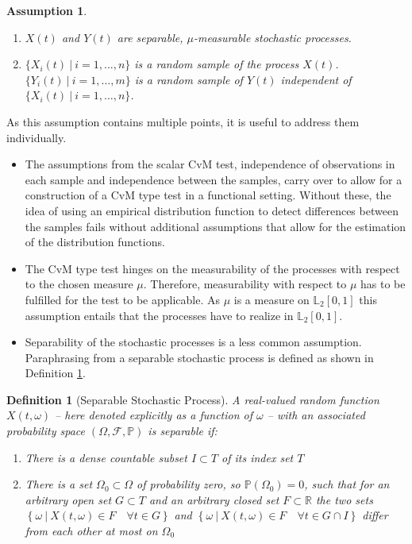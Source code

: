 \documentclass[12pt, a4paper]{article}
\theoremstyle{MAstyle} \newtheorem{assumption}{Assumption}[section]
\theoremstyle{MAstyle} \newtheorem{definition}{Definition}[section]
\theoremstyle{MAstyle} \newtheorem{theorem}{Theorem}[section]
\begin{document}
			\newpage
			\begin{assumption}\label{Ass1}\hfill\vspace{-0.8cm}
				\begin{enumerate}
					\item $X(t)$ and $Y(t)$ are separable, $\mu$-measurable stochastic processes.
					\item $\{X_i(t) \: \vert \: i = 1, \dots, n\}$ is a random sample of the process $X(t)$. \\
					$\{Y_i(t) \: \vert \: i = 1, \dots, m\}$ is a random sample of $Y(t)$ independent of $\{X_i(t) \: \vert \: i = 1, \dots, n\}$.
				\end{enumerate}
			\end{assumption}
		As this assumption contains multiple points, it is useful to address them individually.
			\begin{itemize}
				\item The assumptions from the scalar CvM test, independence of observations in each sample and independence between the samples, carry over to allow for a construction of a CvM type test in a functional setting. Without these, the idea of using an empirical distribution function to detect differences between the samples fails without additional assumptions that allow for the estimation of the distribution functions.
				\item The CvM type test hinges on the measurability of the processes with respect to the chosen measure $\mu$. Therefore, measurability with respect to $\mu$ has to be fulfilled for the test to be applicable. As $\mu$ is a measure on $\mathbb{L}_2[0,1]$ this assumption entails that the processes have to realize in $\mathbb{L}_2[0,1]$.
				\item Separability of the stochastic processes is a less common assumption. Paraphrasing from \cite{gihman_theory_2004} a separable stochastic process is defined as shown in Definition \ref{separability}.
			\end{itemize}
			\begin{definition}[Separable Stochastic Process]\label{separability}
				A real-valued random function $X(t, \omega)$ -- here denoted explicitly as a function of $\omega$ -- with an associated probability space $\left(\Omega, \mathcal{F}, \mathbb{P}\right)$ is separable if:
				\begin{enumerate}
					\item There is a dense countable subset $I \subset T$ of its index set $T$
					\item There is a set $\Omega_0 \subset \Omega$ of probability zero, so $\mathbb{P}\left(\Omega_0\right) = 0$, such that for an arbitrary open set $G \subset T$ and an arbitrary closed set $F \subset \mathbb{R}$ the two sets $\left\{\omega \ \vert \ X(t, \omega) \in F \quad \forall t \in G\right\}$ and $\left\{\omega \ \vert \ X(t, \omega) \in F \quad \forall t \in G \cap I\right\}$ differ from each other at most on $\Omega_0$
				\end{enumerate}      
			\end{definition}
\end{document}
